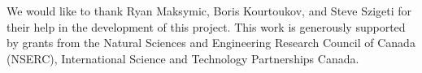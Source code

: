 \documentclass{chi-ext}
\begin{document}
We would like to thank Ryan Maksymic, Boris Kourtoukov, and Steve Szigeti for their help in the development of this project. This work is generously supported by grants from the Natural Sciences and Engineering Research Council of Canada (NSERC), International Science and Technology Partnerships Canada.

\balance


\end{document}
